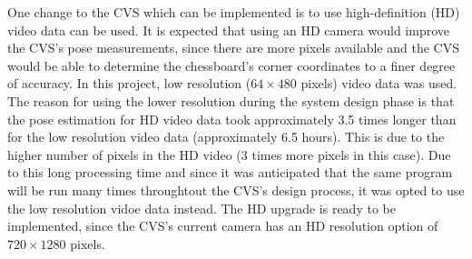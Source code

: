 One change to the CVS which can be implemented is to use high-definition (HD) video data can be used. It is expected that using an HD camera would improve the CVS's pose measurements, since there are more pixels available and the CVS would be able to determine the chessboard's corner coordinates to a finer degree of accuracy. In this project, low resolution ($64\times480$ pixels) video data was used. The reason for using the lower resolution during the system design phase is that the pose estimation for HD video data took approximately 3.5 times longer than for the low resolution video data (approximately 6.5 hours). This is due to the higher number of pixels in the HD video (3 times more pixels in this case). Due to this long processing time and since it was anticipated that the same program will be run many times throughtout the CVS's design process, it was opted to use the low resolution vidoe data instead. The HD upgrade is ready to be implemented, since the CVS's current camera has an HD resolution option of $720\times1280$ pixels. 






